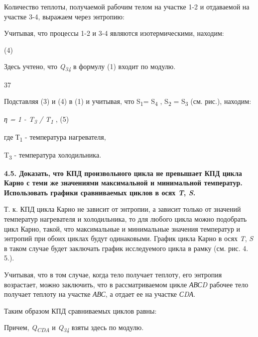 Количество теплоты, получаемой рабочим телом на участке 1-2 и отдаваемой
на участке 3-4, выражаем через энтропию:


Учитывая, что процессы 1-2 и 3-4 являются изотермическими, находим:


(4)

Здесь учтено, что \emph{Q\textsubscript{34}} в формулу (1) входит по
модулю.

37

Подставляя (3) и (4) в (1) и учитывая, что S\textsubscript{1}=
S\textsubscript{4} , S\textsubscript{2} = S\textsubscript{3} (см. рис.),
находим:

\emph{η = 1 - T\textsubscript{3} / T\textsubscript{1}} , (5)

где Т\textsubscript{1} - температура нагревателя,

T\textsubscript{3} - температура холодильника.

\textbf{4.5. Доказать, что КПД произвольного цикла не превышает КПД
цикла Карно с теми же значениями максимальной и минимальной температур.
Использовать графики сравниваемых циклов в осях \emph{T}, \emph{S}.}

\solving{}

Т. к. КПД цикла Карно не зависит от энтропии, а зависит только от
значений температур нагревателя и холодильника, то для любого цикла
можно подобрать цикл Карно, такой, что максимальные и минимальные
значения температур и энтропий при обоих циклах будут одинаковыми.
График цикла Карно в осях \emph{T}, \emph{S} в таком случае будет
заключать график исследуемого цикла в рамку (см. рис. 4. 5.).

Учитывая, что в том случае, когда тело получает теплоту, его энтропия
возрастает, можно заключить, что в рассматриваемом цикле \emph{АВСD}
рабочее тело получает теплоту на участке \emph{АВС}, а отдает ее на
участке \emph{СDА}.

Таким образом КПД сравниваемых циклов равны:




Причем, \emph{Q\textsubscript{CDA}} и \emph{Q\textsubscript{34}} взяты
здесь по модулю.

